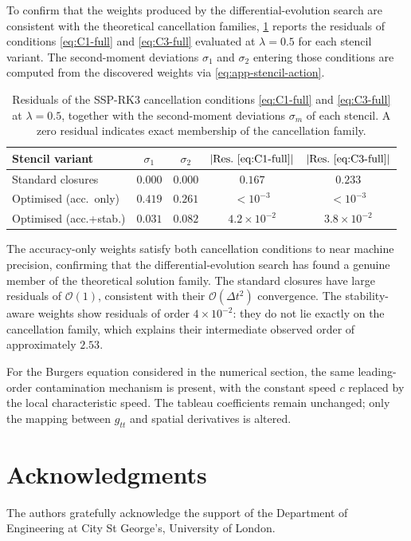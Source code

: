 \documentclass[review,hidelinks,onefignum,onetabnum]{siamart251216}
\newcommand{\Dt}{\Delta t}
\newcommand{\Order}[1]{\mathcal{O}\!\left(#1\right)}
\begin{document}
To confirm that the weights produced by the differential-evolution search are consistent with the theoretical cancellation families, \cref{tab:residuals} reports the residuals of conditions \eqref{eq:C1-full} and \eqref{eq:C3-full} evaluated at $\lambda=0.5$ for each stencil variant. The second-moment deviations $\sigma_1$ and $\sigma_2$ entering those conditions are computed from the discovered weights via \eqref{eq:app-stencil-action}.

\begin{table}[tbhp]
\centering
\caption{Residuals of the SSP-RK3 cancellation conditions \eqref{eq:C1-full} and \eqref{eq:C3-full} at $\lambda=0.5$, together with the second-moment deviations $\sigma_m$ of each stencil. A zero residual indicates exact membership of the cancellation family.}
\label{tab:residuals}
\begin{tabular}{lcccc}
\toprule
Stencil variant
  & $\sigma_1$
  & $\sigma_2$
  & $|\text{Res.}~\eqref{eq:C1-full}|$
  & $|\text{Res.}~\eqref{eq:C3-full}|$ \\
\midrule
Standard closures       & $0.000$ & $0.000$ & $0.167$ & $0.233$ \\
Optimised (acc.\ only)  & $0.419$ & $0.261$ & $<10^{-3}$ & $<10^{-3}$ \\
Optimised (acc.+stab.)  & $0.031$ & $0.082$ & $4.2\times10^{-2}$ & $3.8\times10^{-2}$ \\
\bottomrule
\end{tabular}
\end{table}

The accuracy-only weights satisfy both cancellation conditions to near machine precision, confirming that the differential-evolution search has found a genuine member of the theoretical solution family. The standard closures have large residuals of $\Order{1}$, consistent with their $\Order{\Dt^2}$ convergence. The stability-aware weights show residuals of order $4\times10^{-2}$: they do not lie exactly on the cancellation family, which explains their intermediate observed order of approximately $2.53$.

\begin{remark}
\label{rem:nonlinear}
For the Burgers equation considered in the numerical section, the same leading-order contamination mechanism is present, with the constant speed $c$ replaced by the local characteristic speed. The tableau coefficients remain unchanged; only the mapping between $g_{tt}$ and spatial derivatives is altered.
\end{remark}

\section*{Acknowledgments}
The authors gratefully acknowledge the support of the Department of Engineering at City St George's, University of London.



\end{document}
